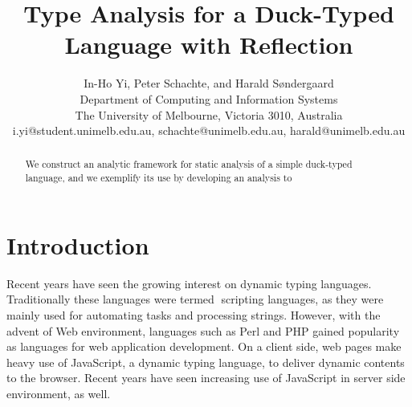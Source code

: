 \documentclass{CRPITStyle}
\begin{document}
\title{Type Analysis for a Duck-Typed Language with Reflection}

\author{In-Ho Yi, Peter Schachte, and Harald S{\o}ndergaard\\
  Department of Computing and Information Systems \\
  The University of Melbourne, Victoria 3010,
  Australia \\
  {i.yi@student.unimelb.edu.au,
    schachte@unimelb.edu.au,
    harald@unimelb.edu.au
  }
}

\maketitle
{}

\maketitle


\begin{abstract}

We construct an analytic framework for static analysis of a simple
duck-typed language, and we exemplify its use by developing an
analysis to 

\end{abstract}

\section{Introduction}

Recent years have seen the growing interest on dynamic typing languages.
Traditionally these languages were termed 􏰁scripting languages,
as they were mainly used for automating tasks and processing strings.
However, with the advent of Web environment, languages such as Perl and 
PHP gained popularity as languages for web application development. 
On a client side, web pages make heavy use of JavaScript, 
a dynamic typing language, to deliver dynamic contents to the browser. 
Recent years have seen increasing use of JavaScript in server side 
environment, as well.
\end{document}
